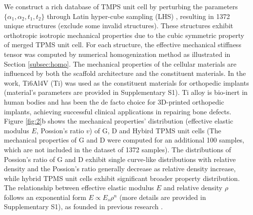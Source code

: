 \documentclass[preprint,review,12pt,authoryear]{elsarticle}
\begin{document}
We construct a rich database of TMPS unit cell by perturbing the parameters $\{\alpha_1, \alpha_2, t_1, t_2\} $ through Latin hyper-cube sampling (LHS) , resulting in 1372 unique structures (exclude some invalid structures). These structures exhibit orthotropic isotropic mechanical properties due to the cubic symmetric property of merged TPMS unit cell. For each structure, the effective mechanical stiffness tensor was computed by numerical homogenization method as illustrated in Section \ref{subsec:homo}. The mechanical properties of the cellular materials are influenced by both the scaffold architecture and the constituent materials. In the work, Ti6Al4V (Ti) was used as the constituent materials for orthopedic implants \citep{Peng2023} (material's parameters are provided in Supplementary S1). Ti alloy is bio-inert in human bodies and has been the de facto choice for 3D-printed orthopedic implants, achieving successful clinical applications in repairing bone defects. Figure \ref{fig:2}b shows the mechanical properties' distribution (effective elastic modulus $E$, Possion's ratio $v$) of G, D and Hybird TPMS unit cells (The mechanical properties of G and D were computed for an additional 100 samples, which are not included in the dataset of 1372 samples). The distributions of Possion's ratio of G and D exhibit single curve-like distributions with relative density and the Possion's ratio generally decrease as relative density increase, while hybrid TPMS unit cells exhibit significant broader property distribution. The relationship between effective elastic modulus $E$ and relative density $\rho$ follows an exponential form $E \propto E_s\rho^{n}$ (more details are provided in Supplementary S1), as founded in previous research \citep{Bauer2017}.
\end{document}
